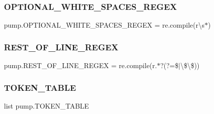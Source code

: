 \subsubsection{\texorpdfstring{OPTIONAL\_WHITE\_SPACES\_REGEX}{OPTIONAL\_WHITE\_SPACES\_REGEX}}
{\footnotesize\ttfamily pump.\+O\+P\+T\+I\+O\+N\+A\+L\+\_\+\+W\+H\+I\+T\+E\+\_\+\+S\+P\+A\+C\+E\+S\+\_\+\+R\+E\+G\+EX = re.\+compile(r\textquotesingle{}\textbackslash{}s$\ast$\textquotesingle{})}

\mbox{\label{namespacepump_a4c1f68b32fcb8366051b574cf2e6aef1}} 
\subsubsection{\texorpdfstring{REST\_OF\_LINE\_REGEX}{REST\_OF\_LINE\_REGEX}}
{\footnotesize\ttfamily pump.\+R\+E\+S\+T\+\_\+\+O\+F\+\_\+\+L\+I\+N\+E\+\_\+\+R\+E\+G\+EX = re.\+compile(r\textquotesingle{}.$\ast$?(?=\$$\vert$\textbackslash{}\$\textbackslash{}\$)\textquotesingle{})}

\mbox{\label{namespacepump_a132b35d1104c7f479aa21c345f413477}} 
\subsubsection{\texorpdfstring{TOKEN\_TABLE}{TOKEN\_TABLE}}
{\footnotesize\ttfamily list pump.\+T\+O\+K\+E\+N\+\_\+\+T\+A\+B\+LE}


